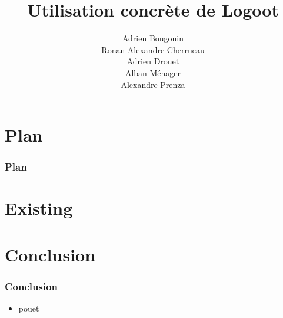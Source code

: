 \documentclass[14pt]{beamer}
\title{Utilisation concrète de Logoot}
\author{Adrien Bougouin\\
        Ronan-Alexandre Cherrueau\\
        Adrien Drouet\\
        Alban Ménager\\
        Alexandre Prenza}
\begin{document}
\begin{frame}
	\titlepage
\end{frame}

\section*{Plan}
\begin{frame}
	\frametitle{Plan}
	\tableofcontents[hideallsubsections]
\end{frame}

  
  
  
  
  
  
  

\section{Existing}

	
\section{Conclusion}
	\begin{frame}
		\frametitle{Conclusion}
		\begin{itemize}
			\item pouet
		\end{itemize}
	\end{frame}
\end{document}
